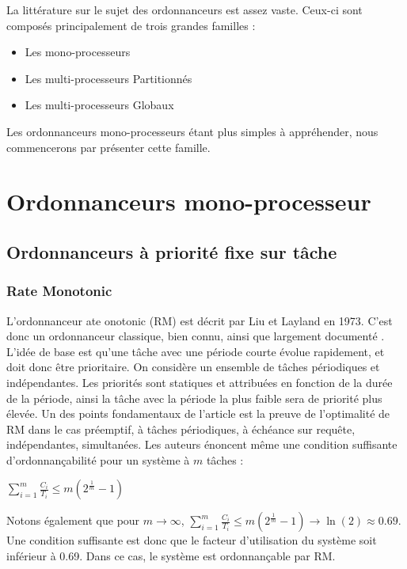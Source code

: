	La littérature sur le sujet des ordonnanceurs est assez vaste. 
	Ceux-ci sont composés principalement de trois grandes familles :\medskip
	\begin{itemize}
		\item Les mono-processeurs
		\item Les multi-processeurs Partitionnés
		\item Les multi-processeurs Globaux
	\end{itemize}
	Les ordonnanceurs mono-processeurs étant plus simples à appréhender, nous commencerons 
	par présenter cette famille.
	
	\section{Ordonnanceurs mono-processeur}
	\subsection{Ordonnanceurs à priorité fixe sur tâche}
	
	\subsubsection{Rate Monotonic}
	L'ordonnanceur ate onotonic (RM) est décrit par Liu et Layland \cite{liu_scheduling_1973} en 1973. C'est 
	donc un ordonnanceur classique, bien connu, ainsi que largement documenté \cite{kermia_ordonnancement_2009}. 
	L'idée de base est qu'une tâche avec une période courte évolue rapidement, et 
	doit donc être prioritaire.\medskip
	On considère un ensemble de tâches périodiques et indépendantes.
	Les priorités sont statiques et attribuées en fonction de la durée de la période, ainsi 
	la tâche avec la période la plus faible sera de priorité plus élevée. 
	Un des points fondamentaux de l'article est la preuve de l'optimalité de RM dans le cas 
	préemptif, à tâches périodiques, à échéance sur requête, indépendantes, simultanées.
	Les auteurs énoncent même une condition suffisante d'ordonnançabilité pour un système à $m$ tâches : \medskip
	\begin{center}
		$\sum_{i=1}^{m}\frac{C_i}{T_i} \leq m(2^{\frac{1}{m}}-1)$
	\end{center}
	Notons également que pour $m \rightarrow \infty$, $\sum_{i=1}^{m}\frac{C_i}{T_i} \leq m(2^{\frac{1}{m}}-1) \rightarrow \ln(2) \approx 0.69$.
	Une condition suffisante est donc que le facteur d'utilisation du système soit inférieur à 0.69. 
	Dans ce cas, le système est ordonnançable par RM.\medskip
	
